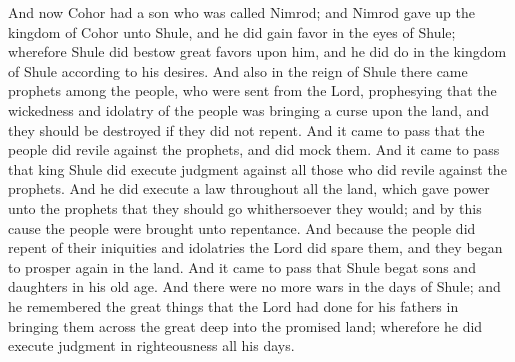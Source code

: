 \bverse \iffalse And now Cohor had a son who was called Nimrod; and Nimrod gave up the kingdom of Cohor unto Shule, and he did gain favor in the eyes of Shule; wherefore Shule did bestow great favors upon him, and he did do in the kingdom of Shule according to his desires. \fi
And now Cohor had a son who was called Nimrod; and Nimrod gave up the kingdom of Cohor unto Shule, and he did gain favor in the eyes of Shule; wherefore Shule did bestow great favors upon him, and he did do in the kingdom of Shule according to his desires.
\bverse \iffalse And also in the reign of Shule there came prophets among the people, who were sent from the Lord, prophesying that the wickedness and idolatry of the people was bringing a curse upon the land, and they should be destroyed if they did not repent. \fi
And also in the reign of Shule there came prophets among the people, who were sent from the Lord, prophesying that the wickedness and idolatry of the people was bringing a curse upon the land, and they should be destroyed if they did not repent.
\bverse \iffalse And it came to pass that the people did revile against the prophets, and did mock them. And it came to pass that king Shule did execute judgment against all those who did revile against the prophets. \fi
And it came to pass that the people did revile against the prophets, and did mock them. And it came to pass that king Shule did execute judgment against all those who did revile against the prophets.
\bverse \iffalse And he did execute a law throughout all the land, which gave power unto the prophets that they should go whithersoever they would; and by this cause the people were brought unto repentance. \fi
And he did execute a law throughout all the land, which gave power unto the prophets that they should go whithersoever they would; and by this cause the people were brought unto repentance.
\bverse \iffalse And because the people did repent of their iniquities and idolatries the Lord did spare them, and they began to prosper again in the land. And it came to pass that Shule begat sons and daughters in his old age. \fi
And because the people did repent of their iniquities and idolatries the Lord did spare them, and they began to prosper again in the land. And it came to pass that Shule begat sons and daughters in his old age.
\bverse \iffalse And there were no more wars in the days of Shule; and he remembered the great things that the Lord had done for his fathers in bringing them across the great deep into the promised land; wherefore he did execute judgment in righteousness all his days. \fi
And there were no more wars in the days of Shule; and he remembered the great things that the Lord had done for his fathers in bringing them across the great deep into the promised land; wherefore he did execute judgment in righteousness all his days.

